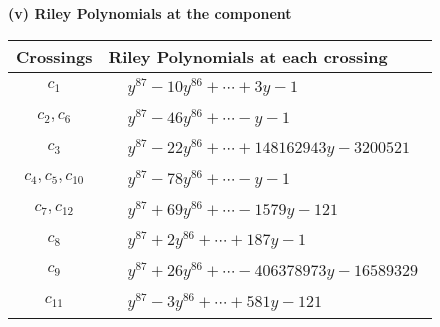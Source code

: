 \documentclass[1p]{elsarticle_modified}
\theoremstyle{definition}
\begin{document}
\newpage\renewcommand{\arraystretch}{1}
\flushleft \textbf{(v) Riley Polynomials at the component}\newline \\
\begin{tabular}{m{50pt}|m{274pt}}
Crossings & \hspace{64pt}Riley Polynomials at each crossing \\
\hline $$\begin{aligned}c_{1}\end{aligned}$$&$\begin{aligned}
&y^{87}-10 y^{86}+\cdots+3 y-1
\end{aligned}$\\
\hline $$\begin{aligned}c_{2},c_{6}\end{aligned}$$&$\begin{aligned}
&y^{87}-46 y^{86}+\cdots- y-1
\end{aligned}$\\
\hline $$\begin{aligned}c_{3}\end{aligned}$$&$\begin{aligned}
&y^{87}-22 y^{86}+\cdots+148162943 y-3200521
\end{aligned}$\\
\hline $$\begin{aligned}c_{4},c_{5},c_{10}\end{aligned}$$&$\begin{aligned}
&y^{87}-78 y^{86}+\cdots- y-1
\end{aligned}$\\
\hline $$\begin{aligned}c_{7},c_{12}\end{aligned}$$&$\begin{aligned}
&y^{87}+69 y^{86}+\cdots-1579 y-121
\end{aligned}$\\
\hline $$\begin{aligned}c_{8}\end{aligned}$$&$\begin{aligned}
&y^{87}+2 y^{86}+\cdots+187 y-1
\end{aligned}$\\
\hline $$\begin{aligned}c_{9}\end{aligned}$$&$\begin{aligned}
&y^{87}+26 y^{86}+\cdots-406378973 y-16589329
\end{aligned}$\\
\hline $$\begin{aligned}c_{11}\end{aligned}$$&$\begin{aligned}
&y^{87}-3 y^{86}+\cdots+581 y-121
\end{aligned}$\\
\hline
\end{tabular}\\~\\
\end{document}

